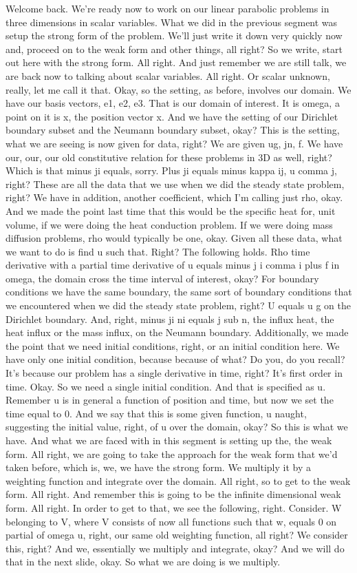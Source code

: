\documentclass[10pt]{article}
\begin{document}
Welcome back. We're ready now to work on our linear parabolic problems in three dimensions in scalar variables. What we did in the previous segment was setup the strong form of the problem. We'll just write it down very quickly now and, proceed on to the weak form and other things, all right? So we write, start out here with the strong form. All right. And just remember we are still talk, we are back now to talking about scalar variables. All right. Or scalar unknown, really, let me call it that. Okay, so the setting, as before, involves our domain. We have our basis vectors, e1, e2, e3. That is our domain of interest. It is omega, a point on it is x, the position vector x. And we have the setting of our Dirichlet boundary subset and the Neumann boundary subset, okay? This is the setting, what we are seeing is now given for data, right? We are given ug, jn, f. We have our, our, our old constitutive relation for these problems in 3D as well, right? Which is that minus ji equals, sorry. Plus ji equals minus kappa ij, u comma j, right? These are all the data that we use when we did the steady state problem, right? We have in addition, another coefficient, which I'm calling just rho, okay. And we made the point last time that this would be the specific heat for, unit volume, if we were doing the heat conduction problem. If we were doing mass diffusion problems, rho would typically be one, okay. Given all these data, what we want to do is find u such that. Right? The following holds. Rho time derivative with a partial time derivative of u equals minus j i comma i plus f in omega, the domain cross the time interval of interest, okay? For boundary conditions we have the same boundary, the same sort of boundary conditions that we encountered when we did the steady state problem, right? U equals u g on the Dirichlet boundary. And, right, minus ji ni equals j sub n, the influx heat, the heat influx or the mass influx, on the Neumann boundary. Additionally, we made the point that we need initial conditions, right, or an initial condition here. We have only one initial condition, because because of what? Do you, do you recall? It's because our problem has a single derivative in time, right? It's first order in time. Okay. So we need a single initial condition. And that is specified as u. Remember u is in general a function of position and time, but now we set the time equal to 0. And we say that this is some given function, u naught, suggesting the initial value, right, of u over the domain, okay? So this is what we have. And what we are faced with in this segment is setting up the, the weak form. All right, we are going to take the approach for the weak form that we'd taken before, which is, we, we have the strong form. We multiply it by a weighting function and integrate over the domain. All right, so to get to the weak form. All right. And remember this is going to be the infinite dimensional weak form. All right. In order to get to that, we see the following, right. Consider. W belonging to V, where V consists of now all functions such that w, equals 0 on partial of omega u, right, our same old weighting function, all right? We consider this, right? And we, essentially we multiply and integrate, okay? And we will do that in the next slide, okay. So what we are doing is we multiply. 
\end{document}

